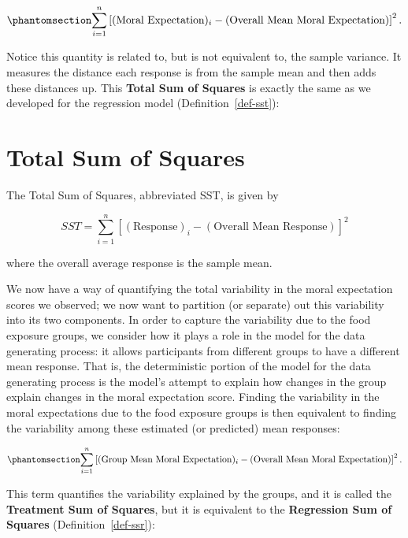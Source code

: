 \documentclass[
  letterpaper,
  DIV=11,
  numbers=noendperiod]{scrreprt}
\theoremstyle{plain}
\theoremstyle{definition}
\theoremstyle{definition}
\theoremstyle{remark}
\begin{document}
\begin{equation}\phantomsection\label{eq-anovateststat-sst}{\sum_{i=1}^{n} \left[(\text{Moral Expectation})_i - (\text{Overall Mean Moral Expectation})\right]^2.}\end{equation}

Notice this quantity is related to, but is not equivalent to, the sample
variance. It measures the distance each response is from the sample mean
and then adds these distances up. This \textbf{Total Sum of Squares} is
exactly the same as we developed for the regression model
(Definition~\ref{def-sst}):

\section{Total Sum of Squares}\label{total-sum-of-squares-1}

The Total Sum of Squares, abbreviated SST, is given by

\[SST = \sum_{i=1}^{n} \left[(\text{Response})_i - (\text{Overall Mean Response})\right]^2\]

where the overall average response is the sample mean.

We now have a way of quantifying the total variability in the moral
expectation scores we observed; we now want to partition (or separate)
out this variability into its two components. In order to capture the
variability due to the food exposure groups, we consider how it plays a
role in the model for the data generating process: it allows
participants from different groups to have a different mean response.
That is, the deterministic portion of the model for the data generating
process is the model's attempt to explain how changes in the group
explain changes in the moral expectation score. Finding the variability
in the moral expectations due to the food exposure groups is then
equivalent to finding the variability among these estimated (or
predicted) mean responses:

\begin{equation}\phantomsection\label{eq-anovateststat-ssr}{\sum_{i=1}^{n} \left[(\text{Group Mean Moral Expectation})_i - (\text{Overall Mean Moral Expectation})\right]^2.}\end{equation}

This term quantifies the variability explained by the groups, and it is
called the \textbf{Treatment Sum of Squares}, but it is equivalent to
the \textbf{Regression Sum of Squares} (Definition~\ref{def-ssr}):
\end{document}
